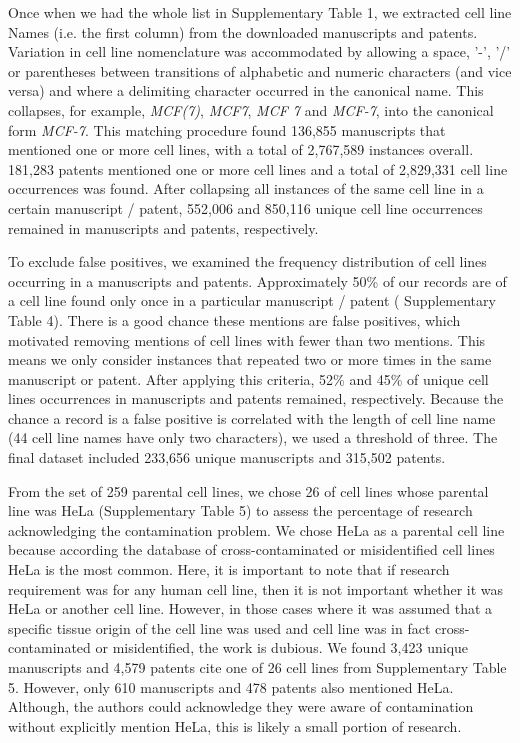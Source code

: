 \documentclass[12pt]{article}
\begin{document}
Once when we had the whole list in Supplementary Table 1, we extracted cell line Names (i.e. the first column) from the downloaded manuscripts and patents. Variation in cell line nomenclature was accommodated by allowing a space, '-', '/' or parentheses between transitions of alphabetic and numeric characters (and vice versa) and where a delimiting character occurred in the canonical name. This collapses, for example, \textit{MCF(7)}, \textit{MCF7}, \textit{MCF 7} and \textit{MCF-7}, into the canonical form \textit{MCF-7}. This matching procedure found 136,855 manuscripts that mentioned one or more cell lines, with a total of 2,767,589 instances overall. 181,283 patents mentioned one or more cell lines and a total of 2,829,331 cell line occurrences was found. After collapsing all instances of the same cell line in a certain manuscript / patent, 552,006 and 850,116 unique cell line occurrences remained in manuscripts and patents, respectively. 

To exclude false positives, we examined the frequency distribution of cell lines occurring in a manuscripts and patents. Approximately 50\% of our records are of a cell line found only once in a particular manuscript / patent ( Supplementary Table 4). There is a good chance these mentions are false positives, which motivated removing mentions of cell lines with fewer than two mentions. This means we only consider instances that repeated two or more times in the same manuscript or patent. After applying this criteria, 52\% and 45\% of unique cell lines occurrences in manuscripts and patents remained, respectively. Because the chance a record is a false positive is correlated with the length of cell line name (44 cell line names have only two characters), we used a threshold of three. The final dataset included 233,656 unique manuscripts and 315,502 patents.

From the set of 259 parental cell lines, we chose 26 of cell lines whose parental line was HeLa (Supplementary Table 5) to assess the percentage of research acknowledging the contamination problem. We chose HeLa as a parental cell line because according the database of cross-contaminated or misidentified cell lines \cite{capes2010check} HeLa is the most common. Here, it is important to note that if research requirement was for any human cell line, then it is not important whether it was HeLa or another cell line. However, in those cases where it was assumed that a specific tissue origin of the cell line was used and cell line was in fact cross-contaminated or misidentified, the work is dubious. We found 3,423 unique manuscripts and 4,579 patents cite one of 26 cell lines from Supplementary Table 5. However, only 610 manuscripts and 478 patents also mentioned HeLa. Although, the authors could acknowledge they were aware of contamination without explicitly mention HeLa, this is likely a small portion of research.




\end{document}
